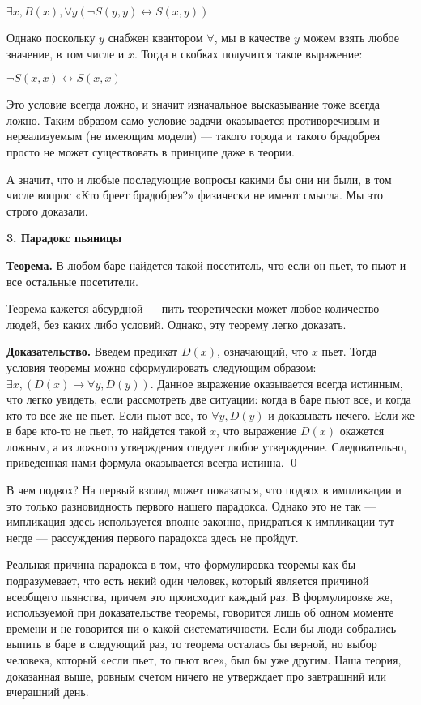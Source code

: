 $\exists x, B(x), \forall y (\neg S(y, y) \leftrightarrow S(x, y))$

Однако поскольку $y$ снабжен квантором $\forall$, мы в качестве $y$ можем взять любое значение, в том числе и $x$. Тогда в скобках получится такое выражение:

$\neg S(x, x) \leftrightarrow S(x, x)$

Это условие всегда ложно, и значит изначальное высказывание тоже всегда ложно. Таким образом само условие задачи оказывается противоречивым и нереализуемым (не имеющим модели) — такого города и такого брадобрея просто не может существовать в принципе даже в теории.

А значит, что и любые последующие вопросы какими бы они ни были, в том числе вопрос «Кто бреет брадобрея?» физически не имеют смысла. Мы это строго доказали.

{\bfseries 3. Парадокс пьяницы}

{\bfseries Теорема.} В любом баре найдется такой посетитель, что если он пьет, то пьют и все остальные посетители.

Теорема кажется абсурдной — пить теоретически может любое количество людей, без каких либо условий. Однако, эту теорему легко доказать.

{\bfseries Доказательство.} Введем предикат $D(x)$, означающий, что $x$ пьет. Тогда условия теоремы можно сформулировать следующим образом: $\exists x, (D(x) \rightarrow \forall y, D(y))$. Данное выражение оказывается всегда истинным, что легко увидеть, если рассмотреть две ситуации: когда в баре пьют все, и когда кто-то все же не пьет. Если пьют все, то $\forall y, D(y)$ и доказывать нечего. Если же в баре кто-то не пьет, то найдется такой $x$, что выражение $D(x)$ окажется ложным, а из ложного утверждения следует любое утверждение. Следовательно, приведенная нами формула оказывается всегда истинна. \qed

В чем подвох? На первый взгляд может показаться, что подвох в импликации и это только разновидность первого нашего парадокса. Однако это не так — импликация здесь используется вполне законно, придраться к импликации тут негде — рассуждения первого парадокса здесь не пройдут.

Реальная причина парадокса в том, что формулировка теоремы как бы подразумевает, что есть некий один человек, который является причиной всеобщего пьянства, причем это происходит каждый раз. В формулировке же, используемой при доказательстве теоремы, говорится лишь об одном моменте времени и не говорится ни о какой систематичности. Если бы люди собрались выпить в баре в следующий раз, то теорема осталась бы верной, но выбор человека, который «если пьет, то пьют все», был бы уже другим. Наша теория, доказанная выше, ровным счетом ничего не утверждает про завтрашний или вчерашний день.

